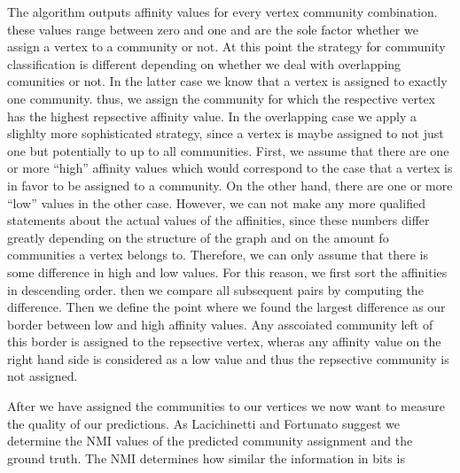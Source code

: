 The algorithm outputs affinity values for every vertex community combination. 
these values range between zero and one and are the sole factor whether we 
assign a vertex to a community or not. At this point the strategy for community 
classification is different depending on whether we deal with overlapping 
comunities or not. In the latter case we know that a vertex is assigned to 
exactly one community. thus, we assign the community for which the respective 
vertex has the highest repsective affinity value. In the overlapping case we 
apply a slighlty more sophisticated strategy, since a vertex is maybe assigned 
to not just one but potentially to up to all communities. First, we assume that 
there are one or more ``high'' affinity values which would correspond to the 
case that a vertex is in favor to be assigned to a community. On the other hand,
 there are one or more ``low'' values in the other case. However, we can not 
make any more qualified statements about the actual values of the affinities, 
since these numbers differ greatly depending on the structure of the graph and 
on the amount fo communities a vertex belongs to. Therefore, we can only assume 
that there is some difference in high and low values. For this reason, we first 
sort the affinities in descending order. then we compare all subsequent pairs 
by computing the difference. Then we define the point where we found the 
largest difference as our border between low and high affinity values. Any 
asscoiated community left of this border is assigned to the repsective vertex, 
wheras any affinity value on the right hand side is considered as a low value 
and thus the repsective community is not assigned.

After we have assigned the communities to our vertices we now want to measure 
the quality of our predictions. As Lacichinetti and Fortunato 
suggest\cite{LF09} we determine the \ac{NMI} values of the predicted community 
assignment and the ground truth. The \ac{NMI} determines how similar the 
information in bits is